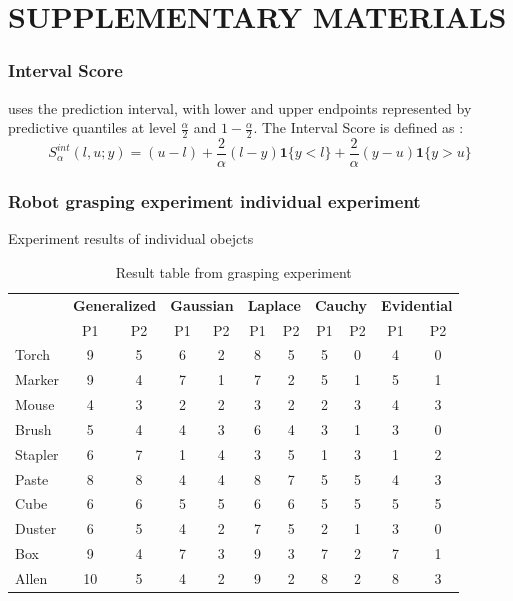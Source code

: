 \documentclass[letterpaper, 10 pt, conference]{ieeeconf}  %
\begin{document}





\section*{SUPPLEMENTARY MATERIALS}
\subsubsection{Interval Score} uses the prediction interval, with lower and upper endpoints represented by predictive quantiles at level $\frac{\alpha}{2}$ and $1 - \frac{\alpha}{2}$. The Interval Score is defined as :
\begin{equation}
S_\alpha^{int} (l,u;y) = (u - l) +\frac{2}{\alpha}(l-y)\mathbf{1}\{y<l\} + \frac{2}{\alpha}(y-u)\mathbf{1}\{y>u\}
\end{equation}


\subsubsection{Robot grasping experiment individual experiment }

Experiment results of individual obejcts 
\begin{table}[htbp]
	\caption{Result table from grasping experiment}
	\centering
	\begin{tabular}{|l|c|c|c|c|c|c|c|c|c|c|}
		\hline
		
		 & \multicolumn{2}{c|}{\textbf{Generalized}} & \multicolumn{2}{c|}{\textbf{Gaussian}} & \multicolumn{2}{c|}{\textbf{Laplace}} & \multicolumn{2}{c|}{\textbf{Cauchy}} & \multicolumn{2}{c|}{\textbf{Evidential}} \\ \cline{2-11} 
		
		& P1 & P2 & P1 & P2 & P1 & P2 & P1 & P2 & P1 & P2 \\ \hline
		Torch & 9 & 5 & 6 & 2 & 8 & 5 & 5 & 0 & 4 & 0 \\ \hline
		Marker & 9 & 4 & 7 & 1 & 7 & 2 & 5 & 1 & 5 & 1 \\ \hline
		Mouse & 4 & 3 & 2 & 2 & 3 & 2 & 2 & 3 & 4 & 3 \\ \hline
		Brush & 5 & 4 & 4 & 3 & 6 & 4 & 3 & 1 & 3 & 0 \\ \hline
		Stapler & 6 & 7 & 1 & 4 & 3 & 5 & 1 & 3 & 1 & 2 \\ \hline
		Paste & 8 & 8 & 4 & 4 & 8 & 7 & 5 & 5 & 4 & 3 \\ \hline
		Cube & 6 & 6 & 5 & 5 & 6 & 6 & 5 & 5 & 5 & 5 \\ \hline
		Duster & 6 & 5 & 4 & 2 & 7 & 5 & 2 & 1 & 3 & 0 \\ \hline
		Box & 9 & 4 & 7 & 3 & 9 & 3 & 7 & 2 & 7 & 1 \\ \hline
		Allen & 10 & 5 & 4 & 2 & 9 & 2 & 8 & 2 & 8 & 3 \\ \hline
		
	\end{tabular}
	
\end{table}
\end{document}
